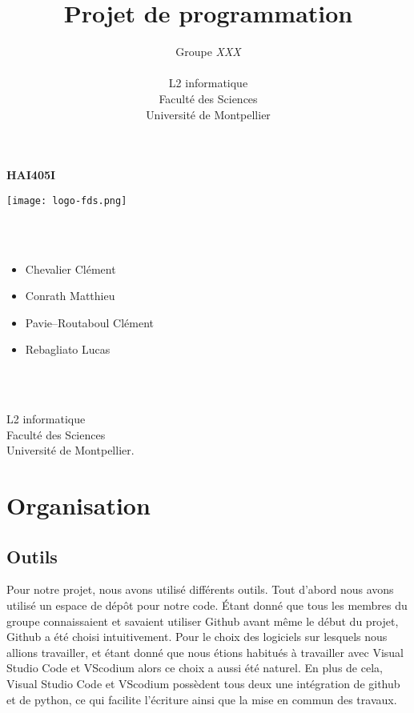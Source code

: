 \documentclass[a4paper, 12pt]{article}
\title{         %
  Projet de programmation}
\author{Groupe \emph{XXX}\\
  \emph{}\\
    L2 informatique\\
  Faculté des Sciences\\
Université de Montpellier}
\begin{document}
\centerline{\Huge\bf HAI405I}
\vspace*{1.5cm}
\begin{center}               %
 
 
  \texttt{[image: logo-fds.png]}   %
 

\end{center}
\vspace*{1.5cm}


\vspace*{1.5cm}

\\ \\

\begin{itemize}\large
\item Chevalier Clément\large
\item Conrath Matthieu\large
\item Pavie--Routaboul Clément\large
\item Rebagliato Lucas\large
\end{itemize}
\\
\\
\vspace*{1.5cm}
\begin{center}
  L2 informatique\\
  Faculté des Sciences\\
Université de Montpellier.
\end{center}

\newpage

\section{Organisation}

\subsection{Outils}

Pour notre projet, nous avons utilisé différents outils. 
Tout d'abord nous avons utilisé un espace de dépôt pour notre code. 
Étant donné que tous les membres du groupe connaissaient et savaient utiliser Github avant même le début du projet, Github a été choisi intuitivement. 
Pour le choix des logiciels sur lesquels nous allions travailler, et étant donné que nous étions habitués à travailler avec Visual Studio Code et VScodium alors ce choix a aussi été naturel. 
En plus de cela, Visual Studio Code et VScodium possèdent tous deux une intégration de github et de python,  ce qui facilite l'écriture ainsi que la mise en commun des travaux.
\end{document}
